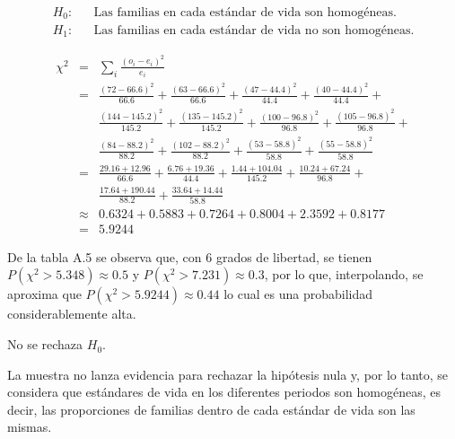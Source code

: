 \begin{solucion}
 \begin{hipotesis}
  \begin{eqnarray*}
   H_0: & & \text{Las familias en cada est\'andar de vida
   son homog\'eneas.} \\
   H_1: & & \text{Las familias en cada est\'andar de vida
   no son homog\'eneas.}
  \end{eqnarray*}
 \end{hipotesis}

 \begin{estadistico}
  \begin{eqnarray*}
   \chi^2 & = & \sum_{i} \frac{\left( o_i - e_i \right)^2}{e_i} \\
   & = & \frac{(72 - 66.6)^2}{66.6} + \frac{(63 - 66.6)^2}{66.6} +
   \frac{(47 - 44.4)^2}{44.4} + \frac{(40 - 44.4)^2}{44.4} + \\
   & & \frac{(144 - 145.2)^2}{145.2} + \frac{(135 - 145.2)^2}{145.2} + \frac{(100 - 96.8)^2}{96.8} + \frac{(105 - 96.8)^2}{96.8} + \\
   & & \frac{(84 - 88.2)^2}{88.2} + \frac{(102 - 88.2)^2}{88.2} +
   \frac{(53 - 58.8)^2}{58.8} + \frac{(55 - 58.8)^2}{58.8} \\
   & = & \frac{29.16 + 12.96}{66.6} + \frac{6.76 + 19.36}{44.4} +
   \frac{1.44 + 104.04}{145.2} + \frac{10.24 + 67.24}{96.8} + \\
   & & \frac{17.64 + 190.44}{88.2} + \frac{33.64 + 14.44}{58.8} \\
   & \approx & 0.6324 + 0.5883 + 0.7264 + 0.8004 + 2.3592 + 0.8177 \\
   & = & 5.9244
  \end{eqnarray*}
 \end{estadistico}

 \begin{valorp}
  De la tabla A.5 se observa que, con $6$ grados de libertad, se tienen
  $P\left(\chi^2 > 5.348\right) \approx 0.5$ y 
  $P\left(\chi^2 > 7.231\right) \approx 0.3$, por lo que, interpolando,
  se aproxima que $P\left(\chi^2 > 5.9244 \right) \approx 0.44$
  lo cual es una probabilidad considerablemente alta.
 \end{valorp}

 \begin{decision}
  No se rechaza $H_0$.
 \end{decision}

 \begin{conclusion}
  La muestra no lanza evidencia para rechazar la hip\'otesis nula
  y, por lo tanto, se considera que est\'andares de vida
  en los diferentes periodos son homog\'eneas, es decir, 
  las proporciones de familias dentro de cada est\'andar de vida
  son las mismas.
 \end{conclusion}


\end{solucion}
